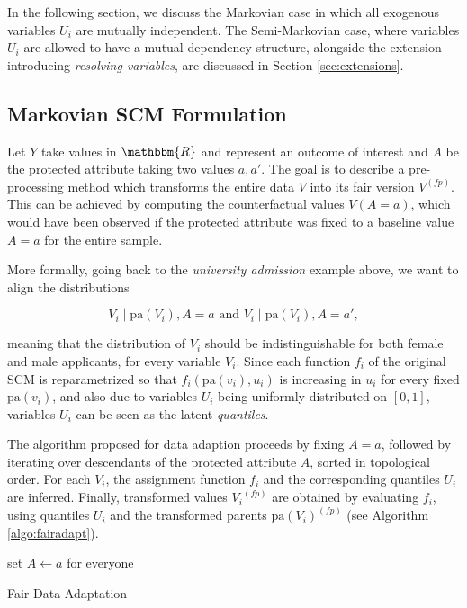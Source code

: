 \documentclass[
  nojss]{jss}
\begin{document}
In the following section, we discuss the Markovian case in which all
exogenous variables \(U_i\) are mutually independent. The Semi-Markovian
case, where variables \(U_i\) are allowed to have a mutual dependency
structure, alongside the extension introducing \emph{resolving
variables}, are discussed in Section \ref{sec:extensions}.

\hypertarget{markovian-scm-formulation}{%
\subsection{Markovian SCM Formulation}\label{markovian-scm-formulation}}

Let \(Y\) take values in \(\mathbbm{R}\) and represent an outcome of
interest and \(A\) be the protected attribute taking two values
\(a, a'\). The goal is to describe a pre-processing method which
transforms the entire data \(V\) into its fair version \( {V}^{(fp)}\).
This can be achieved by computing the counterfactual values
\(V(A = a)\), which would have been observed if the protected attribute
was fixed to a baseline value \(A = a\) for the entire sample.

More formally, going back to the \emph{university admission} example
above, we want to align the distributions

\[V_i \mid \mathrm{pa}(V_i), A = a \text{ and } V_i \mid \mathrm{pa}(V_i), A = a',\]

meaning that the distribution of \(V_i\) should be indistinguishable for
both female and male applicants, for every variable \(V_i\). Since each
function \(f_i\) of the original SCM is reparametrized so that
\(f_i(\mathrm{pa}(v_i), u_i)\) is increasing in \(u_i\) for every fixed
\(\mathrm{pa}(v_i)\), and also due to variables \(U_i\) being uniformly
distributed on \([0, 1]\), variables \(U_i\) can be seen as the latent
\emph{quantiles}.

The algorithm proposed for data adaption proceeds by fixing \(A = a\),
followed by iterating over descendants of the protected attribute \(A\),
sorted in topological order. For each \(V_i\), the assignment function
\(f_i\) and the corresponding quantiles \(U_i\) are inferred. Finally,
transformed values \( {V_i}^{(fp)}\) are obtained by evaluating \(f_i\),
using quantiles \(U_i\) and the transformed parents
\( {\mathrm{pa}(V_i)}^{(fp)}\) (see Algorithm \ref{algo:fairadapt}).

\begin{algorithm}
    \DontPrintSemicolon
    set $A \gets a$ for everyone\\
    \caption{Fair Data Adaptation}
    \label{algo:fairadapt}
\end{algorithm}
\end{document}
